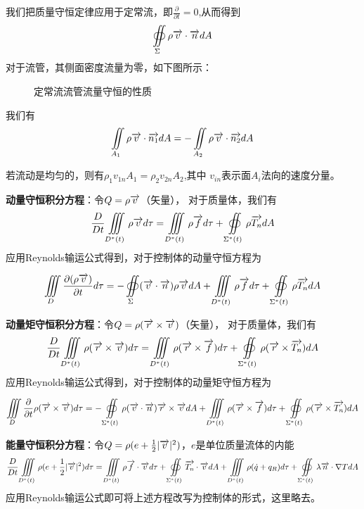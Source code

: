 我们把质量守恒定律应用于定常流，即$\frac{\partial}{\partial t}=0$,从而得到
\begin{equation}
\oiint\limits_{\Sigma} \rho \overrightarrow{v}\cdot \overrightarrow{n} dA
\end{equation}
对于流管，其侧面密度流量为零，如下图所示：
\begin{figure}[!ht]
\def\svgwidth{5cm}
\centering

\caption{定常流流管流量守恒的性质}\label{fig:41ST}
\end{figure}

我们有
\begin{equation}
\iint\limits_{A_1} \rho\overrightarrow{v}\cdot \overrightarrow{n_1} dA=-\iint\limits_{A_2} \rho\overrightarrow{v}\cdot \overrightarrow{n_2} dA
\end{equation}

若流动是均匀的，则有$\rho_1 v_{1n} A_1 = \rho_2 v_{2n} A_2$,其中 $v_{in}$表示面$A_i$法向的速度分量。


\textbf{动量守恒积分方程}：令$Q=\rho\overrightarrow{v}$（矢量），
对于质量体，我们有
\begin{equation}
\frac{D}{Dt}\iiint\limits_{D^*(t)} \rho \overrightarrow{v} d\tau = \iiint\limits_{D^*(t)} \rho \overrightarrow{f} d\tau + 
\oiint\limits_{\Sigma^*(t)} \rho \overrightarrow{T_n} dA
\end{equation}
应用Reynolds输运公式得到，对于控制体的动量守恒方程为

\begin{equation}\label{eq:41Momen}
\iiint\limits_{D}\frac{\partial (\rho\overrightarrow{v})}{\partial t} d\tau = - \oiint\limits_{\Sigma} (\overrightarrow{v}\cdot \overrightarrow{n})\rho \overrightarrow{v} dA +
\iiint\limits_{D^*(t)} \rho \overrightarrow{f} d\tau + 
\oiint\limits_{\Sigma^*(t)} \rho \overrightarrow{T_n} dA
\end{equation}

\textbf{动量矩守恒积分方程}：令$Q=\rho(\overrightarrow{r} \times \overrightarrow{v})$（矢量），
对于质量体，我们有
\begin{equation}
\frac{D}{Dt}\iiint\limits_{D^*(t)} \rho(\overrightarrow{r} \times \overrightarrow{v}) d\tau = \iiint\limits_{D^*(t)} \rho (\overrightarrow{r}\times \overrightarrow{f}) d\tau + 
\oiint\limits_{\Sigma^*(t)} \rho (\overrightarrow{r} \times \overrightarrow{T_n}) dA
\end{equation}
应用Reynolds输运公式得到，对于控制体的动量矩守恒方程为

\begin{equation}
\iiint\limits_{D}\frac{\partial}{\partial t}\rho(\overrightarrow{r} \times \overrightarrow{v}) d\tau = 
-\oiint\limits_{\Sigma^*(t)} \rho (\overrightarrow{v} \cdot \overrightarrow{n})\overrightarrow{r} \times \overrightarrow{v} dA+
 \iiint\limits_{D^*(t)} \rho (\overrightarrow{r}\times \overrightarrow{f}) d\tau + 
\oiint\limits_{\Sigma^*(t)} \rho (\overrightarrow{r} \times \overrightarrow{T_n}) dA
\end{equation}


\textbf{能量守恒积分方程}：令$Q=\rho(e+\frac{1}{2}|\overrightarrow{v}|^2)$，$e$是单位质量流体的内能
\begin{equation}\label{eq:41Energy}
\frac{D}{Dt}\iiint\limits_{D^*(t)} \rho(e+\frac{1}{2}|\overrightarrow{v}|^2) d\tau = \iiint\limits_{D^*(t)} \rho \overrightarrow{f}\cdot\overrightarrow{v} d\tau + 
\oiint\limits_{\Sigma^*(t)}  \overrightarrow{T_n}\cdot\overrightarrow{v} dA + \iiint\limits_{D^*(t)}\rho (\dot{q}+q_R)d\tau +
\oiint\limits_{\Sigma^*(t)} \lambda \overrightarrow{n}\cdot \nabla T dA
\end{equation}
应用Reynolds输运公式即可将上述方程改写为控制体的形式，这里略去。
